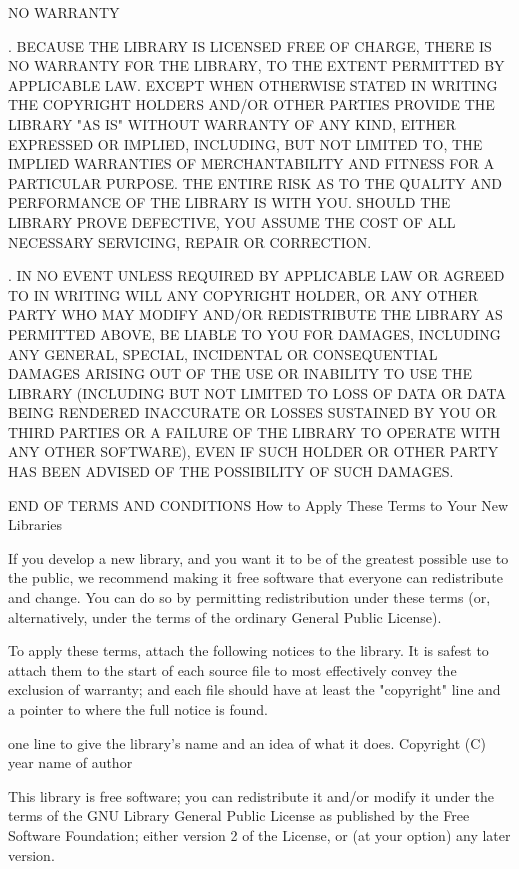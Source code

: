\vparasmall
NO WARRANTY

. BECAUSE THE LIBRARY IS LICENSED FREE OF CHARGE, THERE IS NO WARRANTY FOR THE LIBRARY, TO THE EXTENT PERMITTED BY APPLICABLE LAW. EXCEPT WHEN OTHERWISE STATED IN WRITING THE COPYRIGHT HOLDERS AND/OR OTHER PARTIES PROVIDE THE LIBRARY "AS IS" WITHOUT WARRANTY OF ANY KIND, EITHER EXPRESSED OR IMPLIED, INCLUDING, BUT NOT LIMITED TO, THE IMPLIED WARRANTIES OF MERCHANTABILITY AND FITNESS FOR A PARTICULAR PURPOSE. THE ENTIRE RISK AS TO THE QUALITY AND PERFORMANCE OF THE LIBRARY IS WITH YOU. SHOULD THE LIBRARY PROVE DEFECTIVE, YOU ASSUME THE COST OF ALL NECESSARY SERVICING, REPAIR OR CORRECTION. 

. IN NO EVENT UNLESS REQUIRED BY APPLICABLE LAW OR AGREED TO IN WRITING WILL ANY COPYRIGHT HOLDER, OR ANY OTHER PARTY WHO MAY MODIFY AND/OR REDISTRIBUTE THE LIBRARY AS PERMITTED ABOVE, BE LIABLE TO YOU FOR DAMAGES, INCLUDING ANY GENERAL, SPECIAL, INCIDENTAL OR CONSEQUENTIAL DAMAGES ARISING OUT OF THE USE OR INABILITY TO USE THE LIBRARY (INCLUDING BUT NOT LIMITED TO LOSS OF DATA OR DATA BEING RENDERED INACCURATE OR LOSSES SUSTAINED BY YOU OR THIRD PARTIES OR A FAILURE OF THE LIBRARY TO OPERATE WITH ANY OTHER SOFTWARE), EVEN IF SUCH HOLDER OR OTHER PARTY HAS BEEN ADVISED OF THE POSSIBILITY OF SUCH DAMAGES. 

END OF TERMS AND CONDITIONS
\vparasmall
How to Apply These Terms to Your New Libraries

\vparasmall
If you develop a new library, and you want it to be of the greatest possible use to the public, we recommend making it free software that everyone can redistribute and change. You can do so by permitting redistribution under these terms (or, alternatively, under the terms of the ordinary General Public License). 

To apply these terms, attach the following notices to the library. It is safest to attach them to the start of each source file to most effectively convey the exclusion of warranty; and each file should have at least the "copyright" line and a pointer to where the full notice is found. 

one line to give the library's name and an idea of what it does.
Copyright (C) year  name of author

This library is free software; you can redistribute it and/or
modify it under the terms of the GNU Library General Public
License as published by the Free Software Foundation; either
version 2 of the License, or (at your option) any later version.

